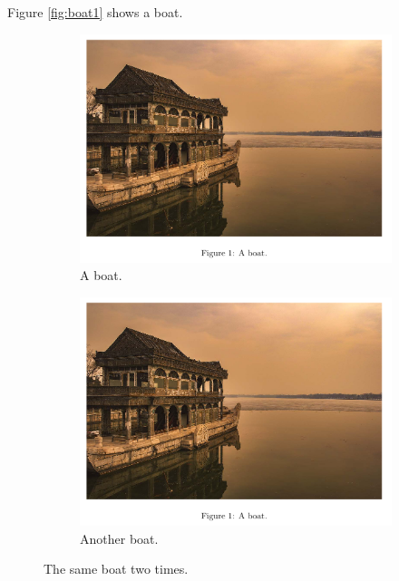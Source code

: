 \documentclass{article}
\begin{document}
    Figure \ref{fig:boat1} shows a boat.

    \begin{figure}[h!]
	\centering
	\begin{subfigure}[b]{0.4\linewidth}
		\includegraphics[width=\linewidth]{images/boat.png}
		\caption{A boat.}
	\end{subfigure}
	\begin{subfigure}[b]{0.4\linewidth}
		\includegraphics[width=\linewidth]{images/boat.png}
		\caption{Another boat.}
	\end{subfigure}
	\caption{The same boat two times.}
	\label{fig:twoboats}
    \end{figure}

    \newpage
\end{document}
